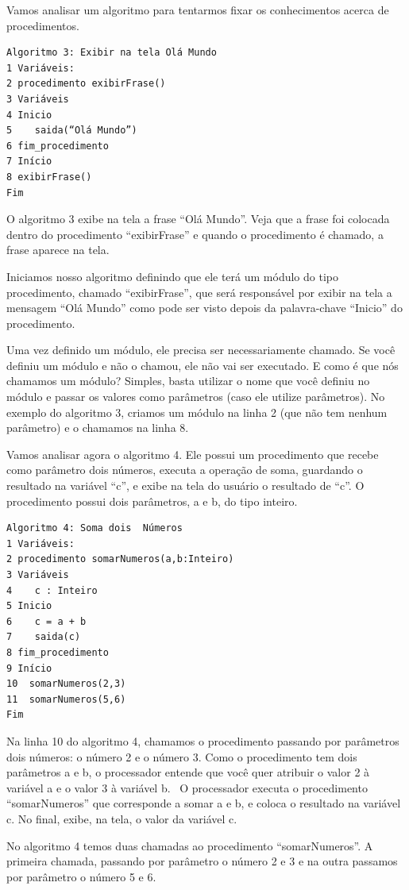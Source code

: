 \documentclass[11pt]{article}
\begin{document}
Vamos analisar um algoritmo para tentarmos fixar os conhecimentos acerca de procedimentos.

\begin{verbatim}
Algoritmo 3: Exibir na tela Olá Mundo
1 Variáveis:
2 procedimento exibirFrase()
3 Variáveis
4 Inicio
5    saida(“Olá Mundo”)
6 fim_procedimento
7 Início
8 exibirFrase()
Fim
\end{verbatim}

O algoritmo 3 exibe na tela a frase “Olá Mundo”. Veja que a frase foi colocada dentro do procedimento “exibirFrase” e quando o procedimento é chamado, a frase aparece na tela.

Iniciamos nosso algoritmo definindo que ele terá um módulo do tipo procedimento, chamado “exibirFrase”, que será responsável por exibir na tela a mensagem “Olá Mundo” como pode ser visto depois da palavra-chave “Inicio” do procedimento.

Uma vez definido um módulo, ele precisa ser necessariamente chamado. Se você definiu um módulo e não o chamou, ele não vai ser executado. E como é que nós chamamos um módulo? Simples, basta utilizar o nome que você definiu no módulo e passar os valores como parâmetros (caso ele utilize parâmetros). No exemplo do algoritmo 3, criamos um módulo na linha 2 (que não tem nenhum parâmetro) e o chamamos na linha 8.

Vamos analisar agora o algoritmo 4. Ele possui um procedimento que recebe como parâmetro dois números, executa a operação de soma, guardando o resultado na variável “c”, e exibe na tela do usuário o resultado de “c”. O procedimento possui dois parâmetros, a e b, do tipo inteiro.

\begin{verbatim}
Algoritmo 4: Soma dois  Números
1 Variáveis:
2 procedimento somarNumeros(a,b:Inteiro)
3 Variáveis
4    c : Inteiro
5 Inicio
6    c = a + b
7    saida(c)
8 fim_procedimento
9 Início
10  somarNumeros(2,3)
11  somarNumeros(5,6)
Fim
\end{verbatim}

Na linha 10 do algoritmo 4, chamamos o procedimento passando por parâmetros dois números: o número 2 e o número 3. Como o procedimento tem dois parâmetros a e b, o processador entende que você quer atribuir o valor 2 à variável a e o valor 3 à variável b.  O processador executa o procedimento “somarNumeros” que corresponde a somar a e b, e coloca o resultado na variável c. No final, exibe, na tela, o valor da variável c.

No algoritmo 4 temos duas chamadas ao procedimento “somarNumeros”. A primeira chamada, passando por parâmetro o número 2 e 3 e na outra passamos por parâmetro o número 5 e 6.
\end{document}

